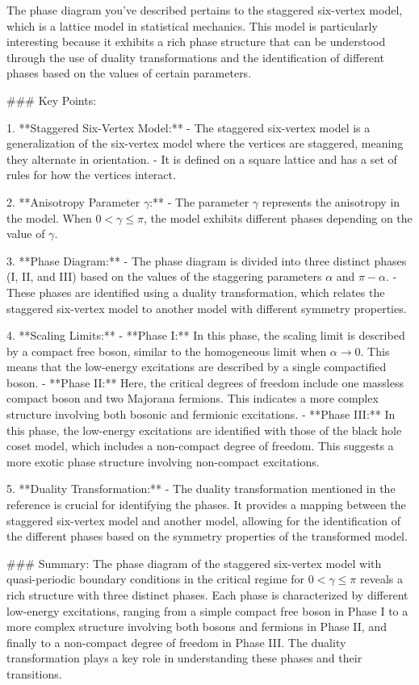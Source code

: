 The phase diagram you've described pertains to the staggered six-vertex model, which is a lattice model in statistical mechanics. This model is particularly interesting because it exhibits a rich phase structure that can be understood through the use of duality transformations and the identification of different phases based on the values of certain parameters.

### Key Points:

1. **Staggered Six-Vertex Model:**
   - The staggered six-vertex model is a generalization of the six-vertex model where the vertices are staggered, meaning they alternate in orientation.
   - It is defined on a square lattice and has a set of rules for how the vertices interact.

2. **Anisotropy Parameter \( \gamma \):**
   - The parameter \( \gamma \) represents the anisotropy in the model. When \( 0 < \gamma \leq \pi \), the model exhibits different phases depending on the value of \( \gamma \).

3. **Phase Diagram:**
   - The phase diagram is divided into three distinct phases (I, II, and III) based on the values of the staggering parameters \( \alpha \) and \( \pi - \alpha \).
   - These phases are identified using a duality transformation, which relates the staggered six-vertex model to another model with different symmetry properties.

4. **Scaling Limits:**
   - **Phase I:** In this phase, the scaling limit is described by a compact free boson, similar to the homogeneous limit when \( \alpha \to 0 \). This means that the low-energy excitations are described by a single compactified boson.
   - **Phase II:** Here, the critical degrees of freedom include one massless compact boson and two Majorana fermions. This indicates a more complex structure involving both bosonic and fermionic excitations.
   - **Phase III:** In this phase, the low-energy excitations are identified with those of the black hole coset model, which includes a non-compact degree of freedom. This suggests a more exotic phase structure involving non-compact excitations.

5. **Duality Transformation:**
   - The duality transformation mentioned in the reference \cite{FrMa12, KoLu23} is crucial for identifying the phases. It provides a mapping between the staggered six-vertex model and another model, allowing for the identification of the different phases based on the symmetry properties of the transformed model.

### Summary:
The phase diagram of the staggered six-vertex model with quasi-periodic boundary conditions in the critical regime for \( 0 < \gamma \leq \pi \) reveals a rich structure with three distinct phases. Each phase is characterized by different low-energy excitations, ranging from a simple compact free boson in Phase I to a more complex structure involving both bosons and fermions in Phase II, and finally to a non-compact degree of freedom in Phase III. The duality transformation plays a key role in understanding these phases and their transitions.